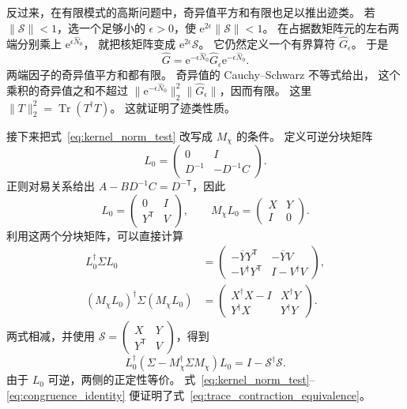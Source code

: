 \documentclass[UTF8,11pt,a4paper,fontset=fandol]{ctexart}
\newcommand{\Tr}{\operatorname{Tr}}
\newcommand{\ee}{\mathrm e}
\newcommand{\trans}{\mathsf T}
\numberwithin{equation}{section}
\begin{document}
反过来，在有限模式的高斯问题中，奇异值平方和有限也足以推出迹类。
若 $\|\mathcal S\|<1$，选一个足够小的 $\epsilon>0$，使
$\ee^{2\epsilon}\|\mathcal S\|<1$。
在占据数矩阵元的左右两端分别乘上
$\ee^{\epsilon\hat N_0}$，
就把核矩阵变成 $\ee^{2\epsilon}\mathcal S$。
它仍然定义一个有界算符 $\hat G_\epsilon$。
于是
\begin{equation}
 \hat G=\ee^{-\epsilon\hat N_0}\hat G_\epsilon
        \ee^{-\epsilon\hat N_0}.
 \label{eq:traceclass_sandwich}
\end{equation}
两端因子的奇异值平方和都有限。
奇异值的 Cauchy--Schwarz 不等式给出，
这个乘积的奇异值之和不超过
$\|\ee^{-\epsilon\hat N_0}\|_2^2\|\hat G_\epsilon\|$，因而有限。
这里 $\|T\|_2^2=\Tr(T^\dagger T)$。
这就证明了迹类性质。

接下来把式~\eqref{eq:kernel_norm_test} 改写成 $M_\chi$ 的条件。
定义可逆分块矩阵
\begin{equation}
 L_0=\begin{pmatrix}0&I\\D^{-1}&-D^{-1}C\end{pmatrix}.
\end{equation}
正则对易关系给出 $A-BD^{-1}C=D^{-\trans}$，因此
\begin{equation}
 L_0=\begin{pmatrix}0&I\\Y^\trans&V\end{pmatrix},
 \qquad
 M_\chi L_0=\begin{pmatrix}X&Y\\I&0\end{pmatrix}.
\end{equation}
利用这两个分块矩阵，可以直接计算
\begin{align}
 L_0^\dagger\Sigma L_0
 &=\begin{pmatrix}
 -\overline Y Y^\trans&-\overline Y V\\
 -V^\dagger Y^\trans&I-V^\dagger V
 \end{pmatrix},\nonumber\\
 (M_\chi L_0)^\dagger\Sigma(M_\chi L_0)
 &=\begin{pmatrix}
 X^\dagger X-I&X^\dagger Y\\
 Y^\dagger X&Y^\dagger Y
 \end{pmatrix}.
\end{align}
两式相减，并使用
$\mathcal S=\left(\begin{smallmatrix}X&Y\\Y^\trans&V\end{smallmatrix}\right)$，得到
\begin{equation}
 L_0^\dagger(\Sigma-M_\chi^\dagger\Sigma M_\chi)L_0
 =I-\mathcal S^\dagger\mathcal S.
 \label{eq:congruence_identity}
\end{equation}
由于 $L_0$ 可逆，两侧的正定性等价。
式~\eqref{eq:kernel_norm_test}--\eqref{eq:congruence_identity}
便证明了式~\eqref{eq:trace_contraction_equivalence}。
\end{document}
